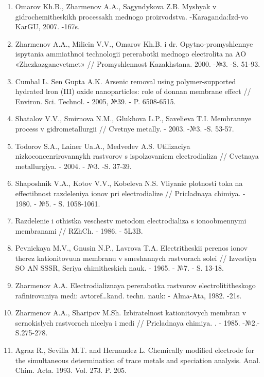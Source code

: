 \begin{enumerate}
\item
Omarov Kh.B., Zharmenov A.A., Sagyndykova Z.B. Myshyak v
gidrochemitheskikh processakh mednogo proizvodstva. -Karaganda:Izd-vo
KarGU, 2007. -167s.

\item
Zharmenov A.A., Milicin V.V., Omarov Kh.B. i dr. Opytno-promyshlennye
ispytania ammiathnoi technologii pererabotki mednogo electrolita na AO
«Zhezkazgancvetmet» // Promyshlennost Kazakhstana. 2000. -№3. -S. 51-93.

\item
Cumbal L. Sen Gupta A.K. Arsenic removal using polymer-supported
hydrated lron (III) oxide nanoparticles: role of donnan membrane effect
// Environ. Sci. Technol. - 2005, №39. - P. 6508-6515.

\item
Shatalov V.V., Smirnova N.M., Glukhova L.P., Savelieva T.I.
Membrannye process v gidrometallurgii // Cvetnye metally. - 2003. -№3.
-S. 53-57.

\item
Todorov S.A., Lainer Ua.A., Medvedev A.S. Utilizaciya
nizkoconcenrirovannykh rastvorov s ispolzovaniem electrodializa //
Cvetnaya metallurgiya. - 2004. - №3. -S. 37-39.

\item
Shaposhnik V.A., Kotov V.V., Kobeleva N.S. Vliyanie plotnosti toka na
effectibnost razdeleniya ionov pri electrodialize // Pricladnaya
chimiya. - 1980. - №5. - S. 1058-1061.

\item
Razdelenie i othistka veschestv metodom electrodializa s
ionoobmennymi membranami // RZhCh. - 1986. - 5L3B.

\item
Pevnickaya M.V., Gnusin N.P., Lavrova T.A. Electritheskii perenos
ionov therez kationitovuua membranu v smeshannych rastvorach solei //
Izvestiya SO AN SSSR, Seriya chimitheskich nauk. - 1965. - №7. - S.
13-18.

\item
Zharmenov A.A. Electrodializnaya pererabotka rastvorov
electrolititheskogo rafinirovaniya medi: avtoref\ldots kand. techn.
nauk: - Alma-Ata, 1982. -21s.

\item
Zharmenov A.A., Sharipov M.Sh. Izbiratelnost kationitovych membran v
sernokislych rastvorach nicelya i medi // Pricladnaya chimiya. . -
1985. -№2.-S.275-278.

\item
Agraz R., Sevilla M.T. and Hernandez L. Chemically modified
electrode for the simultaneous determination of trace metals and
speciation analysis. Anal. Chim. Acta. 1993. Vol. 273. P. 205.


\end{enumerate}
